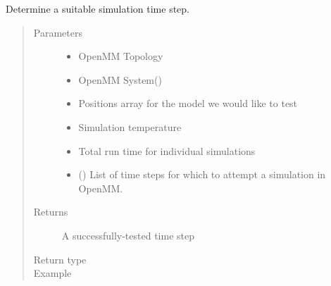\documentclass[letterpaper,12pt,english,openany,oneside]{sphinxmanual}
\begin{document}
\begin{fulllineitems}
\label{\detokenize{simulation:simulation.tools.get_simulation_time_step}}
Determine a suitable simulation time step.
\begin{quote}\begin{description}
\item[{Parameters}] \leavevmode\begin{itemize}
\item {} 
 \textendash{} OpenMM Topology

\item {} 
 \textendash{} OpenMM System()

\item {} 
 \textendash{} Positions array for the model we would like to test

\item {} 
 \textendash{} Simulation temperature

\item {} 
 \textendash{} Total run time for individual simulations

\item {} 
 (\sphinxstyleliteralemphasis{\sphinxupquote{, }}) \textendash{} List of time steps for which to attempt a simulation in OpenMM.

\end{itemize}

\item[{Returns}] \leavevmode
A successfully-tested time step

\item[{Return type}] \leavevmode

 


\item[{Example}] \leavevmode
\end{description}\end{quote}


\end{fulllineitems}
\end{document}

